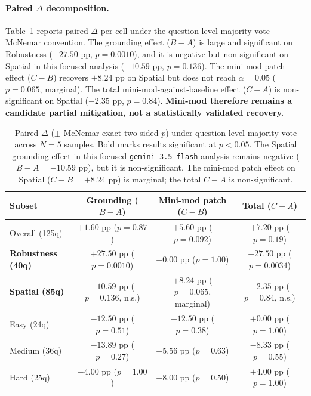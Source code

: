 \paragraph{Paired $\Delta$ decomposition.} Table~\ref{tab:gisr:deltas} reports paired $\Delta$ per cell under the question-level majority-vote McNemar convention. The grounding effect ($B - A$) is large and significant on Robustness ($+27.50$ pp, $p{=}0.0010$), and it is negative but non-significant on Spatial in this focused analysis ($-10.59$ pp, $p{=}0.136$). The mini-mod patch effect ($C - B$) recovers $+8.24$ pp on Spatial but does not reach $\alpha{=}0.05$ ($p{=}0.065$, marginal). The total mini-mod-against-baseline effect ($C - A$) is non-significant on Spatial ($-2.35$ pp, $p{=}0.84$). \textbf{Mini-mod therefore remains a candidate partial mitigation, not a statistically validated recovery.}

\begin{table}[h]
\centering
\scriptsize
\setlength{\tabcolsep}{3.5pt}
\begin{tabular}{lccc}
\toprule
Subset & Grounding ($B - A$) & Mini-mod patch ($C - B$) & Total ($C - A$) \\
\midrule
Overall (125q) & $+1.60$ pp ($p{=}0.87$) & $+5.60$ pp ($p{=}0.092$) & $+7.20$ pp ($p{=}0.19$) \\
\textbf{Robustness (40q)} & $\mathbf{+27.50}$ pp ($p{=}0.0010$) & $+0.00$ pp ($p{=}1.00$) & $\mathbf{+27.50}$ pp ($p{=}0.0034$) \\
\textbf{Spatial (85q)} & $-10.59$ pp ($p{=}0.136$, n.s.) & $+8.24$ pp ($p{=}0.065$, marginal) & $-2.35$ pp ($p{=}0.84$, n.s.) \\
\midrule
Easy (24q) & $-12.50$ pp ($p{=}0.51$) & $+12.50$ pp ($p{=}0.38$) & $+0.00$ pp ($p{=}1.00$) \\
Medium (36q) & $-13.89$ pp ($p{=}0.27$) & $+5.56$ pp ($p{=}0.63$) & $-8.33$ pp ($p{=}0.55$) \\
Hard (25q) & $-4.00$ pp ($p{=}1.00$) & $+8.00$ pp ($p{=}0.50$) & $+4.00$ pp ($p{=}1.00$) \\
\bottomrule
\end{tabular}
\caption{Paired $\Delta$ ($\pm$ McNemar exact two-sided $p$) under question-level majority-vote across $N{=}5$ samples. Bold marks results significant at $p{<}0.05$. The Spatial grounding effect in this focused \texttt{gemini-3.5-flash} analysis remains negative ($B - A = -10.59$ pp), but it is non-significant. The mini-mod patch effect on Spatial ($C - B = +8.24$ pp) is marginal; the total $C - A$ is non-significant.}
\label{tab:gisr:deltas}
\end{table}

